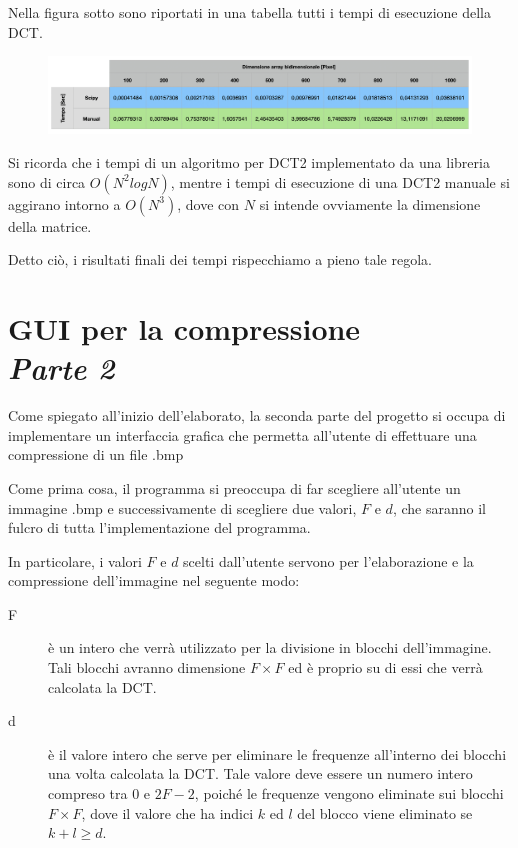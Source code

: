 \documentclass[preprint,12pt]{elsarticle}
\begin{document}
Nella figura sotto sono riportati in una tabella tutti i tempi di esecuzione della DCT.

\begin{figure}[H]
	\centering
	\includegraphics[width=\linewidth]{tabella}
\end{figure}

Si ricorda che i tempi di un algoritmo per DCT2 implementato da una libreria sono di circa $O(N^2 logN)$, mentre i tempi di esecuzione di una DCT2 manuale si aggirano intorno a $O(N^3)$, dove con $N$ si intende ovviamente la dimensione della matrice.

Detto ciò, i risultati finali dei tempi rispecchiamo a pieno tale regola.

\newpage

\section*{GUI per la compressione\\ \large{\textit{Parte 2}}}

Come spiegato all'inizio dell'elaborato, la seconda parte del progetto si occupa di implementare un interfaccia grafica che permetta all'utente di effettuare una compressione di un file .bmp

Come prima cosa, il programma si preoccupa di far scegliere all'utente un immagine .bmp e successivamente di scegliere due valori, $F$ e $d$, che saranno il fulcro di tutta l'implementazione del programma.

In particolare, i valori $F$ e $d$ scelti dall'utente servono per l'elaborazione e la compressione dell'immagine nel seguente modo:
\begin{description}
\item[F] è un intero che verrà utilizzato per la divisione in blocchi dell'immagine. Tali blocchi avranno dimensione $F \times F$ ed è proprio su di essi che verrà calcolata la DCT.
\item[d] è il valore intero che serve per eliminare le frequenze all'interno dei blocchi una volta calcolata la DCT. Tale valore deve essere un numero intero compreso tra $0$ e $2F-2$, poiché le frequenze vengono eliminate sui blocchi $F \times F$, dove il valore che ha indici $k$ ed $l$ del blocco viene eliminato se $k + l \geq d$. 
\end{description}
\end{document}
